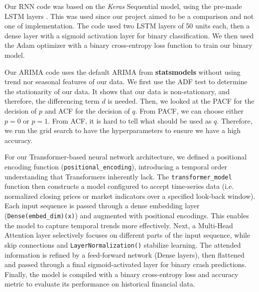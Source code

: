 \documentclass[12pt, letterpaper]{article}
\begin{document}
Our RNN code was based on the \textit{Keras} Sequential model, using the pre-made LSTM layers \cite{keras2024lstm,keras2024sequential}. This was used since our project aimed to be a comparison and not one of implementation. 
The code used two LSTM layers of 50 units each, then a dense layer with a sigmoid activation layer for binary classification. We then used the Adam optimizer with a binary cross-entropy loss function to train our binary model.

Our ARIMA code uses the default ARIMA from \textbf{statsmodels}\cite{statsmodelsARIMA} without using trend nor seasonal features of our data. We first use the ADF test to determine the stationarity of our data. It shows that our data is non-stationary, and therefore, the differencing term $d$ is needed. Then, we looked at the PACF for the decision of $p$ and ACF for the decision of $q$. From PACF, we can choose either $p=0$ or $p=1$. From ACF, it is hard to tell what should be used as $q$. Therefore, we run the grid search to have the hyperparameters to ensure we have a high accuracy. 

For our Transformer-based neural network architecture, we defined a positional encoding function (\texttt{positional\_encoding}), introducing a temporal order understanding that Transformers inherently lack. The \texttt{transformer\_model} function then constructs a model configured to accept time-series data (i.e. normalized closing prices or market indicators over a specified look-back window). Each input sequence is passed through a dense embedding layer (\texttt{Dense(embed\_dim)(x)}) and augmented with positional encodings. This enables the model to capture temporal trends more effectively. Next, a Multi-Head Attention layer selectively focuses on different parts of the input sequence, while skip connections and \texttt{LayerNormalization()} stabilize learning. The attended information is refined by a feed-forward network (Dense layers), then flattened and passed through a final sigmoid-activated layer for binary crash predictions. Finally, the model is compiled with a binary cross-entropy loss and accuracy metric to evaluate its performance on historical financial data.
\end{document}

